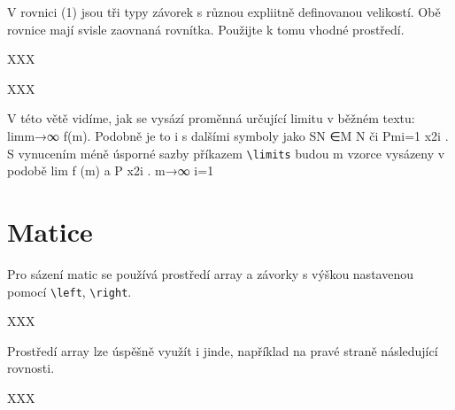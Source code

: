 \documentclass[a4paper, twocolumn, 11pt]{article}
\begin{document}
V rovnici (1) jsou tři typy závorek s různou expliitně definovanou velikostí. Obě rovnice mají svisle zaovnaná rovnítka. Použijte k tomu vhodné prostředí.

XXX

XXX

V této větě vidíme, jak se vysází proměnná určující limitu v běžném textu: limm→∞ f(m). Podobně je to i s dalšími symboly jako SN ∈M N či Pmi=1 x2i . S vynucením méně úsporné sazby příkazem \verb|\limits| budou m
vzorce vysázeny v podobě lim f (m) a P x2i . m→∞ i=1

\section{Matice}

Pro sázení matic se používá prostředí array a závorky s výškou nastavenou pomocí \verb|\left|, \verb|\right|.

XXX

Prostředí array lze úspěšně využít i jinde, například na pravé straně následující rovnosti.

XXX
\end{document}
